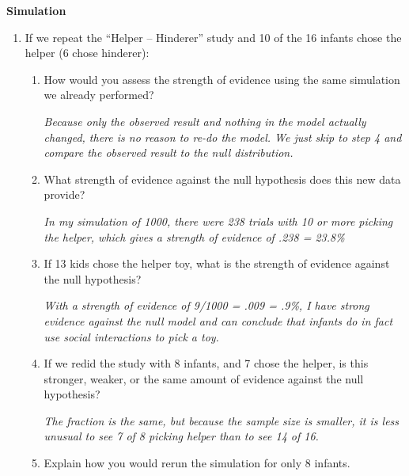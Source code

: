 \begin{center}
{\bf  Simulation}
\end{center}
\begin{enumerate}
\item If we repeat the ``Helper -- Hinderer'' study and  10 of
    the 16 infants chose the helper (6 chose hinderer):
    \begin{enumerate}
    \item How would you assess the strength of evidence using the same
      simulation we already performed?
\begin{students}
        \vspace{3.5cm}
\end{students}

\begin{key}
{\it
      Because only the observed result and nothing in the model
      actually changed, there is no reason to re-do the model.  We
      just skip to step 4 and compare the observed result to the
      null distribution. }
\end{key}
\item What strength of evidence against the null hypothesis
      does this new data provide?
\begin{students}
        \vspace{3.5cm}
\end{students}

\begin{key}
{\it
      In my simulation of 1000, there were 238 trials with 10 or
      more picking the helper, which gives a strength of evidence
      of .238 = 23.8\%}
\end{key}
\item If 13 kids chose the helper toy, what is the strength of evidence
  against the null hypothesis? 
\begin{students}
        \vspace{3.5cm}
\end{students}

\begin{key}
{\it
       With a strength of evidence of 9/1000 = .009 = .9\%, I have
      strong evidence against the null model and can conclude that
      infants do in fact use social interactions to pick a toy. }
\end{key}
\item If we redid the study with 8 infants, and 7 chose the
      helper, is this stronger, weaker, or the same amount of evidence
      against the null hypothesis?      
\begin{students}
        \vspace{3.5cm}
\end{students}
\begin{key}
{\it
      The fraction is the same, but because the sample size is
      smaller, it is less unusual to see 7 of 8 picking helper than
      to see 14 of 16.}
\end{key}
\item Explain how you would rerun the simulation for only 8 infants.
\begin{students}
        \vspace{2cm}
\end{students}
      

\end{enumerate}
\end{enumerate}
